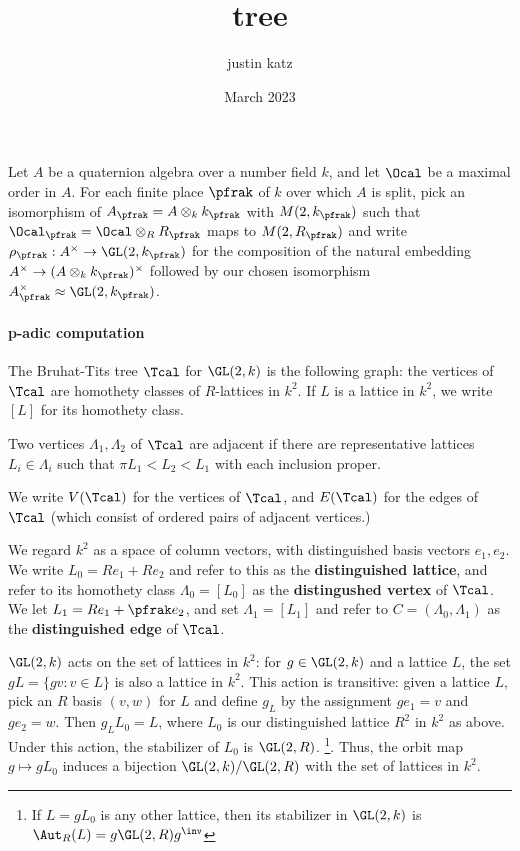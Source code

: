 \documentclass[draft]{article}
\title{tree}
\author{justin katz}
\date{March 2023}
\begin{document}
Let $A$ be a quaternion algebra over a number field $k$, and let $\Ocal$ be a maximal order in $A$. For each finite place $\pfrak$ of $k$ over which $A$ is split, pick an isomorphism of $A_\pfrak =A\otimes_k k_\pfrak$ with $M(2,k_\pfrak)$ such that $\Ocal_\pfrak = \Ocal \otimes_R R_\pfrak$ maps to $M(2,R_\pfrak)$ and write $\rho_\pfrak:A^\times \to \GL(2,k_\pfrak)$ for the composition of the natural embedding $A^\times \to (A\otimes_k k_\pfrak)^\times$ followed by our chosen isomorphism $A_\pfrak^\times \approx \GL(2,k_\pfrak)$. 

\paragraph*{p-adic computation}
\begin{definition}
The Bruhat-Tits tree $\Tcal$ for $\GL(2,k)$ is the following graph: the vertices of $\Tcal$ are homothety classes of $R$-lattices in $k^2$.
If $L$ is a lattice in $k^2$, we write $[L]$ for its homothety class. 

Two vertices $\Lambda_1,\Lambda_2 $ of $\Tcal$ are adjacent if there are representative lattices $L_i \in \Lambda_i$ such that $\pi L_1 < L_2 < L_1$ with each inclusion proper.

We write $V(\Tcal)$ for the vertices of $\Tcal$, and $E(\Tcal)$ for the edges of $\Tcal$ (which consist of ordered pairs of adjacent vertices.)
\end{definition}

We regard $k^2$ as a space of column vectors, with distinguished basis vectors $e_1,e_2$. We write $L_0 = Re_1+Re_2$ and refer to this as the \textbf{distinguished lattice}, and refer to its homothety class $\Lambda_0 = [L_0]$ as the \textbf{distingushed vertex} of $\Tcal$. We let $L_1 = Re_1 + \pfrak e_2$, and set $\Lambda_1 = [L_1]$ and refer to $C=(\Lambda_0,\Lambda_1)$ as the \textbf{distinguished edge} of $\Tcal$. 
 
$\GL(2,k)$ acts on the set of lattices in $k^2$: for $g\in \GL(2,k)$ and a lattice $L$, the set $gL = \{ g v : v \in L\}$ is also a lattice in $k^2$. This action is transitive: given a lattice $L$, pick an $R$ basis $(v,w)$ for $L$ and define $g_L$ by the assignment $ge_1 = v$ and $ge_2 = w$. Then $g_L L_0 =L$, where $L_0$ is our distinguished lattice $R^2$ in $k^2$ as above. Under this action, the stabilizer of $L_0$ is $\GL(2,R)$. \footnote{If $L= gL_0$ is any other lattice, then its stabilizer in $\GL(2,k)$ is $\Aut_R(L)=g \GL(2,R)g^\inv$}. Thus, the orbit map $g \mapsto gL_0$ induces a bijection $\GL(2,k)/ \GL(2,R)$ with the set of lattices in $k^2$. 
\end{document}
